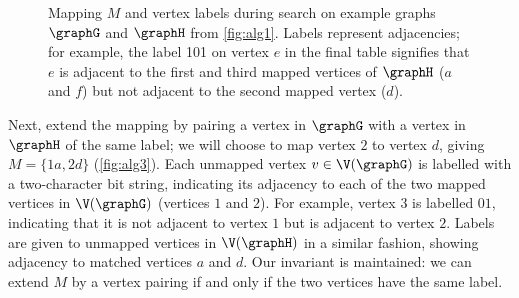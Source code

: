 \begin{figure}[htb]
    \centering
    \par\bigskip
    \par\bigskip

    \caption{Mapping $M$ and vertex labels during search on example graphs $\graphG$ and
    $\graphH$ from \cref{fig:alg1}.  Labels represent adjacencies; for example, the label
    101 on vertex $e$ in the final table signifies that $e$ is adjacent to the first
    and third mapped vertices of $\graphH$ ($a$ and $f$) but not adjacent to the second
    mapped vertex ($d$).}
    \label{figure:mcsplit-examples}
\end{figure}

Next, extend the mapping by pairing a vertex in $\graphG$ with a vertex in $\graphH$ of the
same label; we will choose to map vertex $2$ to vertex $d$, giving $M=\{1a,
2d\}$ (\cref{fig:alg3}).  Each unmapped vertex $v \in \V(\graphG)$ is labelled
with a two-character bit string, indicating its adjacency to each of
the two mapped vertices in $\V(\graphG)$ (vertices $1$ and $2$).  For example, vertex
$3$ is labelled $01$, indicating that it is not adjacent to vertex $1$ but is adjacent
to vertex $2$.  Labels are given to unmapped vertices in $\V(\graphH)$ in a similar fashion,
showing adjacency to matched vertices $a$ and $d$.  Our invariant is
maintained: we can extend $M$ by a vertex pairing if and only if the two
vertices have the same label.

